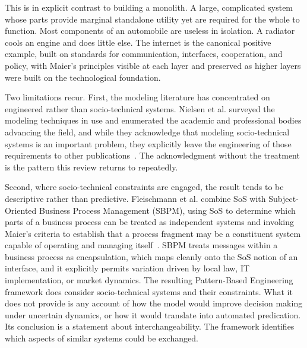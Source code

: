\documentclass{csimq}
\begin{document}
This is in explicit contrast to building a monolith. A large, complicated system
whose parts provide marginal standalone utility yet are required for the whole
to function. Most components of an automobile are useless in isolation. A
radiator cools an engine and does little else. The internet is the canonical
positive example, built on standards for communication, interfaces, cooperation,
and policy, with Maier's principles visible at each layer and preserved as
higher layers were built on the technological foundation.

Two limitations recur. First, the modeling literature has concentrated on
engineered rather than socio-technical systems. Nielsen et al. surveyed the
modeling techniques in use and enumerated the academic and professional bodies
advancing the field, and while they acknowledge that modeling socio-technical
systems is an important problem, they explicitly leave the engineering of those
requirements to other publications~\cite{nielsen2015}. The acknowledgment
without the treatment is the pattern this review returns to repeatedly.

Second, where socio-technical constraints are engaged, the result tends to be
descriptive rather than predictive. Fleischmann et al. combine SoS with
Subject-Oriented Business Process Management (SBPM), using SoS to determine
which parts of a business process can be treated as independent systems and
invoking Maier's criteria to establish that a process fragment may be a
constituent system capable of operating and managing itself~\cite{fleischmann2016}.
SBPM treats messages within a business process as encapsulation, which maps
cleanly onto the SoS notion of an interface, and it explicitly permits variation
driven by local law, IT implementation, or market dynamics. The resulting
Pattern-Based Engineering framework does consider socio-technical systems and
their constraints. What it does not provide is any account of how the model
would improve decision making under uncertain dynamics, or how it would
translate into automated predication. Its conclusion is a statement about interchangeability.
The framework identifies which aspects of similar systems could be exchanged.
\end{document}

